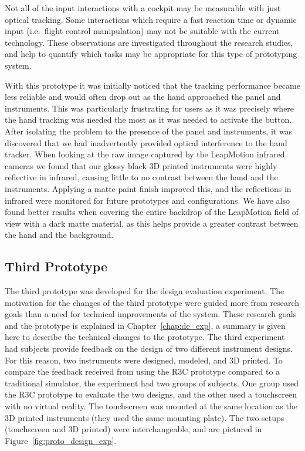 Not all of the input interactions with a cockpit may be measurable with just optical tracking.
Some interactions which require a fast reaction time or dynamic input (i.e.\ flight control manipulation) may not be suitable with the current technology.
These observations are investigated throughout the research studies, and help to quantify which tasks may be appropriate for this type of prototyping system.

With this prototype it was initially noticed that the tracking performance became less reliable and would often drop out as the hand approached the panel and instruments.
This was particularly frustrating for users as it was precisely where the hand tracking was needed the most as it was needed to activate the button.
After isolating the problem to the presence of the panel and instruments, it was discovered that we had inadvertently provided optical interference to the hand tracker.
When looking at the raw image captured by the LeapMotion infrared cameras we found that our glossy black 3D printed instruments were highly reflective in infrared, causing little to no contrast between the hand and the instruments.
Applying a matte paint finish improved this, and the reflections in infrared were monitored for future prototypes and configurations.
We have also found better results when covering the entire backdrop of the LeapMotion field of view with a dark matte material, as this helps provide a greater contrast between the hand and the background.


\subsection{Third Prototype}

The third prototype was developed for the design evaluation experiment.
The motivation for the changes of the third prototype were guided more from research goals than a need for technical improvements of the system.
These research goals and the prototype is explained in Chapter~\ref{chap:de_exp}, a summary is given here to describe the technical changes to the prototype.
The third experiment had subjects provide feedback on the design of two different instrument designs.
For this reason, two instruments were designed, modeled, and 3D printed.
To compare the feedback received from using the R3C prototype compared to a traditional simulator, the experiment had two groups of subjects.
One group used the R3C prototype to evaluate the two designs, and the other used a touchscreen with no virtual reality.
The touchscreen was mounted at the same location as the 3D printed instruments (they used the same mounting plate).
The two setups (touchscreen and 3D printed) were interchangeable, and are pictured in Figure~\ref{fig:proto_design_exp}.

